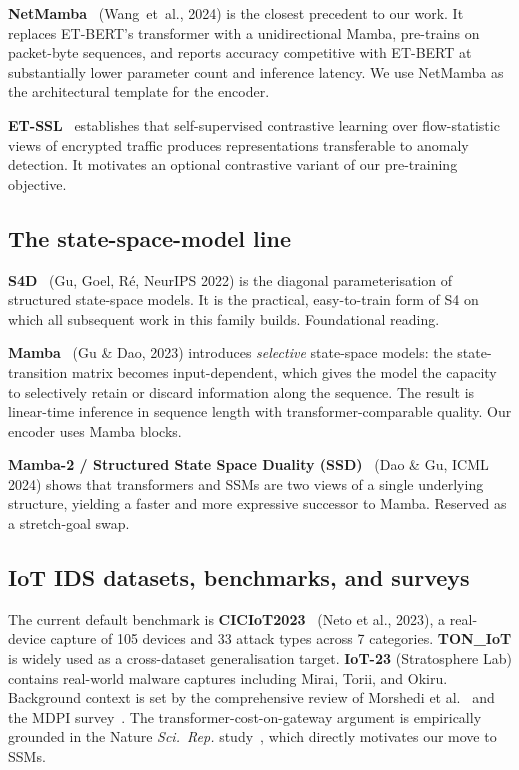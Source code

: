 \documentclass[11pt,a4paper]{article}
\begin{document}
\textbf{NetMamba}~\cite{NetMamba} (Wang~et~al., 2024) is the closest precedent to our work. It replaces ET-BERT's transformer with a unidirectional Mamba, pre-trains on packet-byte sequences, and reports accuracy competitive with ET-BERT at substantially lower parameter count and inference latency. We use NetMamba as the architectural template for the encoder.

\textbf{ET-SSL}~\cite{ETSSL} establishes that self-supervised contrastive learning over flow-statistic views of encrypted traffic produces representations transferable to anomaly detection. It motivates an optional contrastive variant of our pre-training objective.

\subsection{The state-space-model line}
\textbf{S4D}~\cite{S4D} (Gu, Goel, R\'e, NeurIPS 2022) is the diagonal parameterisation of structured state-space models. It is the practical, easy-to-train form of S4 on which all subsequent work in this family builds. Foundational reading.

\textbf{Mamba}~\cite{Mamba} (Gu \& Dao, 2023) introduces \emph{selective} state-space models: the state-transition matrix becomes input-dependent, which gives the model the capacity to selectively retain or discard information along the sequence. The result is linear-time inference in sequence length with transformer-comparable quality. Our encoder uses Mamba blocks.

\textbf{Mamba-2 / Structured State Space Duality (SSD)}~\cite{SSD} (Dao \& Gu, ICML 2024) shows that transformers and SSMs are two views of a single underlying structure, yielding a faster and more expressive successor to Mamba. Reserved as a stretch-goal swap.

\subsection{IoT IDS datasets, benchmarks, and surveys}
The current default benchmark is \textbf{CICIoT2023}~\cite{CICIoT2023} (Neto et al., 2023), a real-device capture of 105 devices and 33 attack types across 7 categories. \textbf{TON\_IoT} is widely used as a cross-dataset generalisation target. \textbf{IoT-23} (Stratosphere Lab) contains real-world malware captures including Mirai, Torii, and Okiru. Background context is set by the comprehensive review of Morshedi et al.~\cite{Morshedi2025} and the MDPI survey~\cite{Sensors2023}. The transformer-cost-on-gateway argument is empirically grounded in the Nature \emph{Sci.\ Rep.} study~\cite{TransformerIoT}, which directly motivates our move to SSMs.
\end{document}
